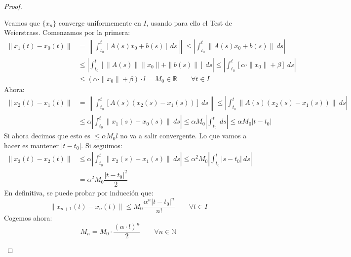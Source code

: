 \begin{teo}
\begin{proof}
\begin{itemize}
\begin{description}
                        Veamos que $\{x_n\}$ converge uniformemente en $I$, usando para ello el Test de Weierstrass. Comenzamos por la primera:
                        \begin{align*}
                            \|x_1(t) - x_0(t)\| &= \left\|\int_{t_0}^{t} [A(s)x_0+b(s)]~ds \right\| \leq \left|\int_{t_0}^{t}\| A(s)x_0 + b(s)\|~ds \right| \\
                                                &\leq \left|\int_{t_0}^{t}\left[ \|A(s)\|\|x_0\| + \|b(s)\|\right]~ds \right| \leq \left|\int_{t_0}^{t} [\alpha\cdot  \|x_0\| + \beta]~ds \right| \\
                                                &\leq (\alpha\cdot \|x_0\|+\beta)\cdot l = M_0 \in \mathbb{R} \qquad \forall t\in I
                        \end{align*}
                        Ahora:
                        \begin{align*}
                            \|x_2(t) - x_1(t)\| &= \left\|\int_{t_0}^{t} [A(s)(x_2(s)-x_1(s))]~ds \right\| \leq  \left|\int_{t_0}^{t} \|A(s)(x_2(s)-x_1(s))\|~ds \right| \\
                                                &\leq \alpha\left|\int_{t_0}^{t} \|x_1(s)-x_0(s)\|~ds \right| \leq \alpha M_0 \left|\int_{t_0}^{t} ~ds \right| \leq \alpha M_0 |t-t_0|
                        \end{align*}
                        Si ahora decimos que esto es $\leq \alpha M_0 l$ no va a salir convergente. Lo que vamos a hacer es mantener $|t-t_0|$. Si seguimos:
                        \begin{align*}
                            \|x_3(t)-x_2(t)\| &\leq \alpha \left|\int_{t_0}^{t} \|x_2(s)-x_1(s)\|~ds \right| \leq \alpha^2 M_0 \left|\int_{t_0}^{t} |s-t_0|~ds \right| \\
                                              &= \alpha^2 M_0 \dfrac{{|t-t_0|}^{2}}{2}
                        \end{align*}
                        En definitiva, se puede probar por inducción que:
                        \begin{equation*}
                            \|x_{n+1}(t) - x_n(t)\| \leq M_0 \dfrac{\alpha^n{|t-t_0|}^{n}}{n!} \qquad \forall t\in I
                        \end{equation*}
                        Cogemos ahora:
                        \begin{equation*}
                            M_n = M_0\cdot  \dfrac{{(\alpha\cdot l)}^{n}}{2} \qquad \forall n\in \mathbb{N}

\end{equation*}
\end{description}
\end{itemize}
\end{proof}
\end{teo}

